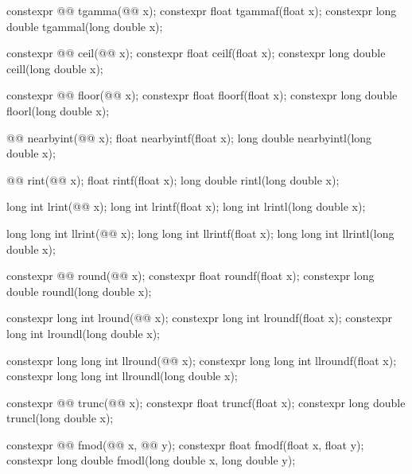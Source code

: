 \begin{codeblock}
{  constexpr @@ tgamma(@@ x);
  constexpr float               tgammaf(float x);
  constexpr long double         tgammal(long double x);

  constexpr @@ ceil(@@ x);
  constexpr float               ceilf(float x);
  constexpr long double         ceill(long double x);

  constexpr @@ floor(@@ x);
  constexpr float               floorf(float x);
  constexpr long double         floorl(long double x);

  @@ nearbyint(@@ x);
  float               nearbyintf(float x);
  long double         nearbyintl(long double x);

  @@ rint(@@ x);
  float               rintf(float x);
  long double         rintl(long double x);

  long int lrint(@@ x);
  long int lrintf(float x);
  long int lrintl(long double x);

  long long int llrint(@@ x);
  long long int llrintf(float x);
  long long int llrintl(long double x);

  constexpr @@ round(@@ x);
  constexpr float               roundf(float x);
  constexpr long double         roundl(long double x);

  constexpr long int lround(@@ x);
  constexpr long int lroundf(float x);
  constexpr long int lroundl(long double x);

  constexpr long long int llround(@@ x);
  constexpr long long int llroundf(float x);
  constexpr long long int llroundl(long double x);

  constexpr @@ trunc(@@ x);
  constexpr float               truncf(float x);
  constexpr long double         truncl(long double x);

  constexpr @@ fmod(@@ x, @@ y);
  constexpr float               fmodf(float x, float y);
  constexpr long double         fmodl(long double x, long double y);

}
\end{codeblock}
